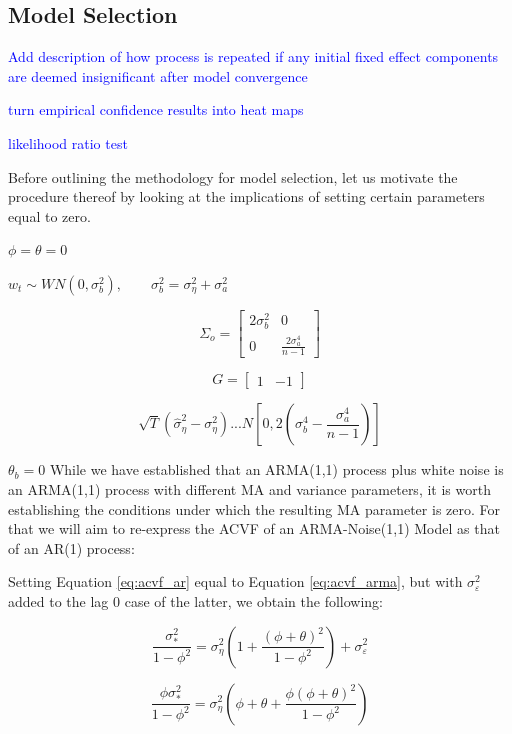 \subsection{Model Selection}


\textcolor{blue}{Add description of how process is repeated if any initial fixed effect components are deemed insignificant after model convergence}


\textcolor{blue}{turn empirical confidence results into heat maps}

\textcolor{blue}{likelihood ratio test}









Before outlining the methodology for model selection, let us motivate the procedure thereof by looking at the implications of setting certain parameters equal to zero.

{$\phi = \theta = 0$}

$w_t \sim WN(0,\sigma_b^2), \qquad \sigma_b^2 = \sigma_\eta^2 + \sigma_a^2$

$$\Sigma_o = \left[\begin{array}{cc}
    2\sigma_b^2 & 0 \\
    0 & \frac{2\sigma_a^4}{n-1}
\end{array}\right]$$

$$G = \left[\begin{array}{cc}
    1 & -1 
\end{array}\right]$$

$$ \sqrt{T}(\hat{\sigma}_\eta^2 - \sigma_\eta^2) ... N\left[0,2\left(\sigma_b^4 - \frac{\sigma_a^4}{n-1}\right)\right] $$

{$\theta_b = 0$}
While we have established that an ARMA(1,1) process plus white noise is an ARMA(1,1) process with different MA and variance parameters, it is worth establishing the conditions under which the resulting MA parameter is zero. For that we will aim to re-express the ACVF of an ARMA-Noise(1,1) Model as that of an AR(1) process:

Setting Equation \ref{eq:acvf_ar} equal to Equation \ref{eq:acvf_arma}, but with $\sigma_\varepsilon^2$ added to the lag 0 case of the latter, we obtain the following:

$$ \frac{\sigma_*^2}{1-\phi^2} = \sigma_\eta^2(1 + \frac{(\phi + \theta)^2}{1 - \phi^2}) + \sigma_\varepsilon^2 $$

$$ \frac{\phi\sigma_*^2}{1-\phi^2} = \sigma_\eta^2(\phi + \theta + \frac{\phi(\phi + \theta)^2}{1 - \phi^2}) $$

